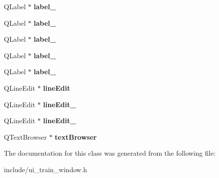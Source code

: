 \begin{DoxyCompactItemize}
\item 
\mbox{\label{classUi__Train__Window_a2a21578047f03dcfca0655ab3ef76020}} 
Q\+Label $\ast$ {\bfseries label\+\_}
\item 
\mbox{\label{classUi__Train__Window_a21e15aaf3a9ef0986bdab9bfa8d27bb8}} 
Q\+Label $\ast$ {\bfseries label\+\_}
\item 
\mbox{\label{classUi__Train__Window_ae71bb145c2c2e58ef5f1f49423c99004}} 
Q\+Label $\ast$ {\bfseries label\+\_}
\item 
\mbox{\label{classUi__Train__Window_a9c14487244fa2234badf43181b0b0a91}} 
Q\+Label $\ast$ {\bfseries label\+\_}
\item 
\mbox{\label{classUi__Train__Window_af2cf8aa8bf19ffc134c3793dd1db2765}} 
Q\+Label $\ast$ {\bfseries label\+\_}
\item 
\mbox{\label{classUi__Train__Window_aebbcb31aaed593bee559c765b711735d}} 
Q\+Line\+Edit $\ast$ {\bfseries line\+Edit}
\item 
\mbox{\label{classUi__Train__Window_ac1111c295bdb26c77ecc1c8625e07930}} 
Q\+Line\+Edit $\ast$ {\bfseries line\+Edit\+\_}
\item 
\mbox{\label{classUi__Train__Window_a8c194e06700eb46441ff0954fad0490f}} 
Q\+Line\+Edit $\ast$ {\bfseries line\+Edit\+\_}
\item 
\mbox{\label{classUi__Train__Window_a9afe2f1c4fcfabd5fdad2201b05c3aa3}} 
Q\+Text\+Browser $\ast$ {\bfseries text\+Browser}
\end{DoxyCompactItemize}


The documentation for this class was generated from the following file\+:\begin{DoxyCompactItemize}
\item 
include/ui\+\_\+train\+\_\+window.\+h\end{DoxyCompactItemize}
